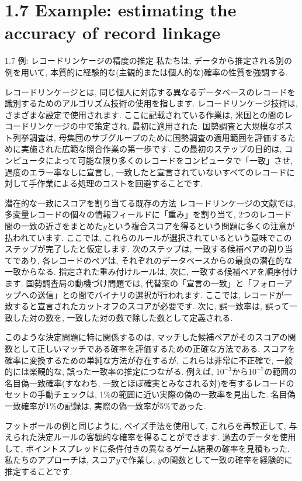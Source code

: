 \documentclass[10pt,dvipdfmx,a4]{beamer}
\begin{document}
\section{1.7 Example: estimating the accuracy of record linkage}
\begin{frame}{1.7 例: レコードリンケージの精度の推定}
私たちは, データから推定される別の例を用いて, 本質的に経験的な(主観的または個人的な)確率の性質を強調する.

レコードリンケージとは, 同じ個人に対応する異なるデータベースのレコードを識別するためのアルゴリズム技術の使用を指します.
レコードリンケージ技術は, さまざまな設定で使用されます.
ここに記載されている作業は, 米国との間のレコードリンケージの中で策定され, 最初に適用された.
国勢調査と大規模なポスト列挙調査は, 母集団のサブグループのために国勢調査の適用範囲を評価するために実施された広範な照合作業の第一歩です.
この最初のステップの目的は, コンピュータによって可能な限り多くのレコードをコンピュータで「一致」させ, 過度のエラー率なしに宣言し, 一致したと宣言されていないすべてのレコードに対して手作業による処理のコストを回避することです.
\end{frame}


\begin{frame}{潜在的な一致にスコアを割り当てる既存の方法}
レコードリンケージの文献では, 多変量レコードの個々の情報フィールドに「重み」を割り当て, 2つのレコード間の一致の近さをまとめた$y$という複合スコアを得るという問題に多くの注意が払われています.
ここでは, これらのルールが選択されているという意味でこのステップが完了したと仮定します.
次のステップは, 一致する候補ペアの割り当てであり, 各レコードのペアは, それぞれのデータベースからの最良の潜在的な一致からなる.
指定された重み付けルールは, 次に, 一致する候補ペアを順序付けます.
国勢調査局の動機づけ問題では, 代替案の「宣言の一致」と「フォローアップへの送信」との間でバイナリの選択が行われます.
ここでは, レコードが一致すると宣言されたカットオフのスコアが必要です.
次に, 誤一致率は, 誤って一致した対の数を, 一致した対の数で除した数として定義される.
\end{frame}


\begin{frame}
このような決定問題に特に関係するのは, マッチした候補ペアがそのスコアの関数として正しいマッチである確率を評価するための正確な方法である.
スコアを確率に変換するための単純な方法が存在するが, これらは非常に不正確で, 一般的には楽観的な, 誤った一致率の推定につながる.
例えば, $10^{-3}$から$10^{-7}$の範囲の名目偽一致確率(すなわち, 一致とほぼ確実とみなされる対)を有するレコードのセットの手動チェックは, 1\%の範囲に近い実際の偽の一致率を見出した.
名目偽一致確率が1\%の記録は, 実際の偽一致率が5\%であった.

フットボールの例と同じように, ベイズ手法を使用して, これらを再較正して, 与えられた決定ルールの客観的な確率を得ることができます.
過去のデータを使用して, ポイントスプレッドに条件付きの異なるゲーム結果の確率を見積もった.
私たちのアプローチは, スコア$y$で作業し, $y$の関数として一致の確率を経験的に推定することです.
\end{frame}
\end{document}
